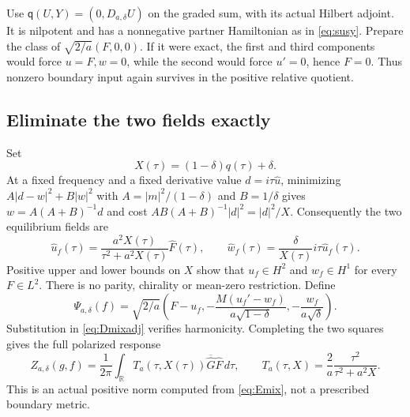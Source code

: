 \documentclass[11pt]{article}
\numberwithin{equation}{section}
\theoremstyle{definition}
\theoremstyle{remark}
\newcommand{\R}{\mathbb R}
\newcommand{\qq}{\mathsf q}
\begin{document}
Use $\qq(U,Y)=(0,D_{a,\delta}U)$ on the graded sum, with its actual Hilbert adjoint. It is nilpotent and has a nonnegative partner Hamiltonian as in \eqref{eq:susy}. Prepare the class of $\sqrt{2/a}(F,0,0)$. If it were exact, the first and third components would force $u=F,w=0$, while the second would force $u'=0$, hence $F=0$. Thus nonzero boundary input again survives in the positive relative quotient.

\subsection{Eliminate the two fields exactly}
Set
\begin{equation}
 X(\tau)=(1-\delta)q(\tau)+\delta.
 \label{eq:X}
\end{equation}
At a fixed frequency and a fixed derivative value $d=i\tau\widehat u$, minimizing $A|d-w|^2+B|w|^2$ with
$A=|m|^2/(1-\delta)$ and $B=1/\delta$ gives $w=A(A+B)^{-1}d$ and cost $AB(A+B)^{-1}|d|^2=|d|^2/X$. Consequently the two equilibrium fields are
\begin{equation}
 \widehat u_f(\tau)=\frac{a^2X(\tau)}{\tau^2+a^2X(\tau)}\widehat F(\tau),
 \qquad
 \widehat w_f(\tau)=\frac\delta{X(\tau)}i\tau\widehat u_f(\tau).
 \label{eq:mixfields}
\end{equation}
Positive upper and lower bounds on $X$ show that $u_f\in H^2$ and $w_f\in H^1$ for every $F\in L^2$. There is no parity, chirality or mean-zero restriction. Define
\begin{equation}
 \Psi_{a,\delta}(f)=\sqrt{2/a}
 \left(F-u_f,-\frac{M(u_f'-w_f)}{a\sqrt{1-\delta}},
                  -\frac{w_f}{a\sqrt\delta}\right).
 \label{eq:mixstate}
\end{equation}
Substitution in \eqref{eq:Dmixadj} verifies harmonicity. Completing the two squares gives the full polarized response
\begin{equation}
 Z_{a,\delta}(g,f)=\frac1{2\pi}\int_\R
 T_a(\tau,X(\tau))\overline{\widehat G}\widehat F\,d\tau,
 \qquad T_a(\tau,X)=\frac2a\frac{\tau^2}{\tau^2+a^2X}.
 \label{eq:Ta}
\end{equation}
This is an actual positive norm computed from \eqref{eq:Emix}, not a prescribed boundary metric.
\end{document}
